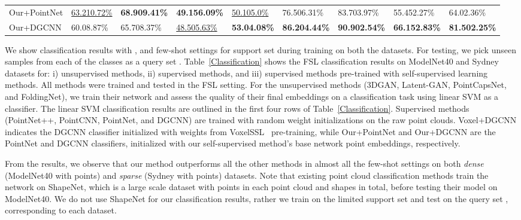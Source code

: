 \documentclass{article}
\begin{document}
\begin{table}[tbp]
\begin{tabular}{lllllllll}
		Our+PointNet & \underline{63.210.72\%} & \textbf{68.909.41\%} &\textbf{49.156.09\%} & \underline{50.105.0\%} &76.506.31\% &83.703.97\% & 55.452.27\% & 64.02.36\% \\
		Our+DGCNN & 60.08.87\% &  65.708.37\% &  \underline{48.505.63\%}& \textbf{53.04.08\%} &\textbf{86.204.44\%} &\textbf{90.902.54\%} & \textbf{66.152.83\%} & \textbf{81.502.25\%}\\
		\bottomrule
	\end{tabular}
\end{table}
We show classification results with , and  few-shot settings for support set  during training on both the datasets. For testing, we pick  unseen samples from each of the  classes as a query set . 
Table~\ref{Classification} shows the FSL classification results on ModelNet40 and Sydney datasets for: i) unsupervised methods, ii) supervised methods, and iii) supervised methods pre-trained with self-supervised learning methods. 
All methods were trained and tested in the FSL setting.
For the unsupervised methods (3DGAN, Latent-GAN, PointCapsNet, and FoldingNet), we train their network and assess the quality of their final embeddings on a classification task using linear SVM as a classifier. The linear SVM classification results are outlined in the first four rows of Table~\ref{Classification}. Supervised methods (PointNet++, PointCNN, PointNet, and DGCNN) are trained with random weight initializations on the raw point clouds. Voxel+DGCNN indicates the DGCNN classifier initialized with weights from VoxelSSL~\cite{sauder2019self} pre-training, while Our+PointNet and Our+DGCNN are the PointNet and DGCNN classifiers, initialized with our self-supervised method's base network point embeddings, respectively.  

From the results, we observe that our method outperforms all the other methods in almost all the few-shot settings on both \emph{dense} (ModelNet40 with  points) and \emph{sparse} (Sydney with  points) datasets. Note that existing point cloud classification methods train the network on ShapeNet, which is a large scale dataset with  points in each point cloud and  shapes in total, before testing their model on ModelNet40. We do not use ShapeNet for our classification results, rather we train on the limited support set  and test on the query set ,
corresponding to each dataset. 
\end{document}
